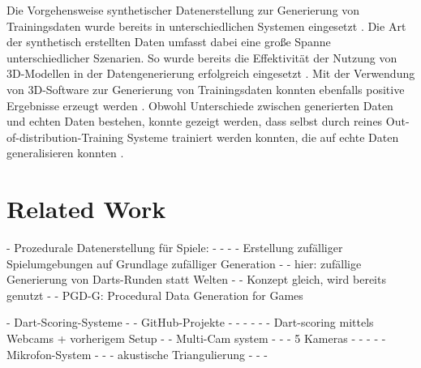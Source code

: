 Die Vorgehensweise synthetischer Datenerstellung zur Generierung von Trainingsdaten wurde bereits in unterschiedlichen Systemen eingesetzt \cite{synth_data}. Die Art der synthetisch erstellten Daten umfasst dabei eine große Spanne unterschiedlicher Szenarien. So wurde bereits die Effektivität der Nutzung von 3D-Modellen in der Datengenerierung erfolgreich eingesetzt \cite{synth_data_procedural,synth_data_cars_with_cam_aug,synth_data_pose_estimation}. Mit der Verwendung von 3D-Software zur Generierung von Trainingsdaten konnten ebenfalls positive Ergebnisse erzeugt werden \cite{synth_data_blender_defects,data_gen_importance,synth_data_importance_2}. Obwohl Unterschiede zwischen generierten Daten und echten Daten bestehen, konnte gezeigt werden, dass selbst durch reines Out-of-distribution-Training Systeme trainiert werden konnten, die auf echte Daten generalisieren konnten \cite{ood_simulated_training}.





\section{Related Work}
\label{sec:related_work}

- Prozedurale Datenerstellung für Spiele:
- - \cite{proc_data_games_1,proc_data_games_2,proc_data_games_3}
- - Erstellung zufälliger Spielumgebungen auf Grundlage zufälliger Generation
- - hier: zufällige Generierung von Darts-Runden statt Welten
- - Konzept gleich, wird bereits genutzt
- - PGD-G: Procedural Data Generation for Games

- Dart-Scoring-Systeme
- - GitHub-Projekte
- - - \cite{darts_project_1,darts_project_2,darts_project_3,darts_proect_4}
- - - Dart-scoring mittels Webcams + vorherigem Setup
- - Multi-Cam system
- - - 5 Kameras
- - - \cite{dart_scoring_multicam}
- - Mikrofon-System
- - - akustische Triangulierung
- - - \cite{dart_scoring_microphone}

